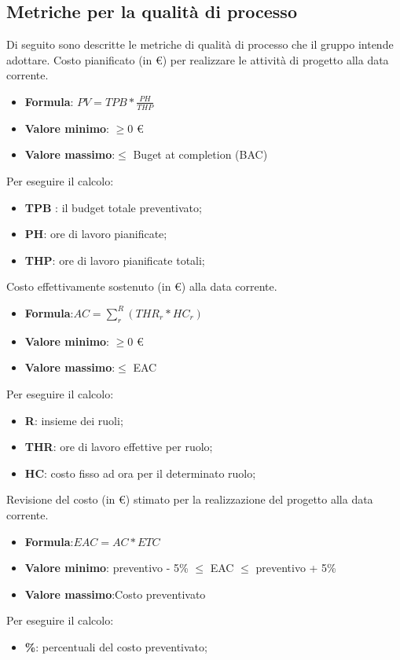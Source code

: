 \subsection{Metriche per la qualità di processo}
Di seguito sono descritte le metriche di qualità di processo che il gruppo intende adottare.
    Costo pianificato (in \euro) per realizzare le attività di progetto alla data corrente.
    \begin{itemize}
        \item \textbf{Formula}: $PV = TPB * \frac{PH}{THP}$
        \item \textbf{Valore minimo}: $\geq0$ \euro
        \item \textbf{Valore massimo}:$\leq$ Buget at completion (BAC)
    \end{itemize}  
    Per eseguire il calcolo:
    \begin{itemize}
        \item \textbf{TPB} : il budget totale preventivato;
        \item \textbf{PH}: ore di lavoro pianificate;
        \item \textbf{THP}: ore di lavoro pianificate totali;
    \end{itemize}

Costo effettivamente sostenuto (in €) alla data corrente. 
\begin{itemize}
    \item \textbf{Formula}:$AC = \sum_{r}^{R}(THR_r*HC_r)$
    \item \textbf{Valore minimo}: $\geq0$ \euro
    \item \textbf{Valore massimo}:$\leq$ EAC
\end{itemize}  
Per eseguire il calcolo:
\begin{itemize}
    \item \textbf{R}: insieme dei ruoli;
    \item \textbf{THR}: ore di lavoro effettive per ruolo;
    \item \textbf{HC}: costo fisso ad ora per il determinato ruolo;
\end{itemize}

Revisione del costo (in \euro) stimato per la realizzazione del progetto alla data corrente. 
\begin{itemize}
    \item \textbf{Formula}:$EAC = AC*ETC$
    \item \textbf{Valore minimo}: preventivo - 5\% $\leq$ EAC $\leq$  preventivo + 5\%
    \item \textbf{Valore massimo}:Costo preventivato
\end{itemize}  
Per eseguire il calcolo:
\begin{itemize}
    \item \textbf{\%}: percentuali del costo preventivato;
\end{itemize}

